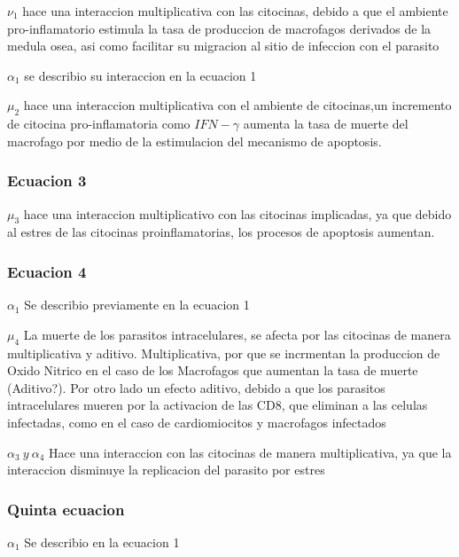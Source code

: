 \documentclass[
]{article}
\begin{document}
\(\nu_{1}\) hace una interaccion multiplicativa con las citocinas,
debido a que el ambiente pro-inflamatorio estimula la tasa de produccion
de macrofagos derivados de la medula osea, asi como facilitar su
migracion al sitio de infeccion con el parasito

\(\alpha_{1}\) se describio su interaccion en la ecuacion 1

\(\mu_{2}\) hace una interaccion multiplicativa con el ambiente de
citocinas,un incremento de citocina pro-inflamatoria como \(IFN-\gamma\)
aumenta la tasa de muerte del macrofago por medio de la estimulacion del
mecanismo de apoptosis.

\hypertarget{ecuacion-3}{%
\subsubsection{Ecuacion 3}\label{ecuacion-3}}

\(\mu_{3}\) hace una interaccion multiplicativo con las citocinas
implicadas, ya que debido al estres de las citocinas proinflamatorias,
los procesos de apoptosis aumentan.

\hypertarget{ecuacion-4}{%
\subsubsection{Ecuacion 4}\label{ecuacion-4}}

\(\alpha_{1}\) Se describio previamente en la ecuacion 1

\(\mu_{4}\) La muerte de los parasitos intracelulares, se afecta por las
citocinas de manera multiplicativa y aditivo. Multiplicativa, por que se
incrmentan la produccion de Oxido Nitrico en el caso de los Macrofagos
que aumentan la tasa de muerte (Aditivo?). Por otro lado un efecto
aditivo, debido a que los parasitos intracelulares mueren por la
activacion de las CD8, que eliminan a las celulas infectadas, como en el
caso de cardiomiocitos y macrofagos infectados

\(\alpha_{3} \ y \ \alpha_{4}\) Hace una interaccion con las citocinas
de manera multiplicativa, ya que la interaccion disminuye la replicacion
del parasito por estres

\hypertarget{quinta-ecuacion}{%
\subsubsection{Quinta ecuacion}\label{quinta-ecuacion}}

\(\alpha_{1}\) Se describio en la ecuacion 1
\end{document}

